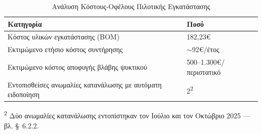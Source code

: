 \begin{table}[htbp]
\centering
\caption{Ανάλυση Κόστους-Οφέλους Πιλοτικής Εγκατάστασης}
\label{tab:pilot_cost_benefit}
\begin{tabular}{|p{10cm}|p{4cm}|}
\hline
\textbf{Κατηγορία} & \textbf{Ποσό} \\
\hline
Κόστος υλικών εγκατάστασης (\textlatin{BOM}) & 182,23\euro \\
\hline
Εκτιμώμενο ετήσιο κόστος συντήρησης & $\sim$92\euro/έτος \\
\hline
Εκτιμώμενο κόστος αποφυγής βλάβης ψυκτικού & 500--1.300\euro/περιστατικό \\
\hline
Εντοπισθείσες ανωμαλίες κατανάλωσης με αυτόματη ειδοποίηση & 2\textsuperscript{2} \\
\hline
\end{tabular}
\end{table}

\noindent\textsuperscript{2} Δύο ανωμαλίες κατανάλωσης εντοπίστηκαν τον Ιούλιο και τον Οκτώβριο 2025 --- βλ. \S~6.2.2.




